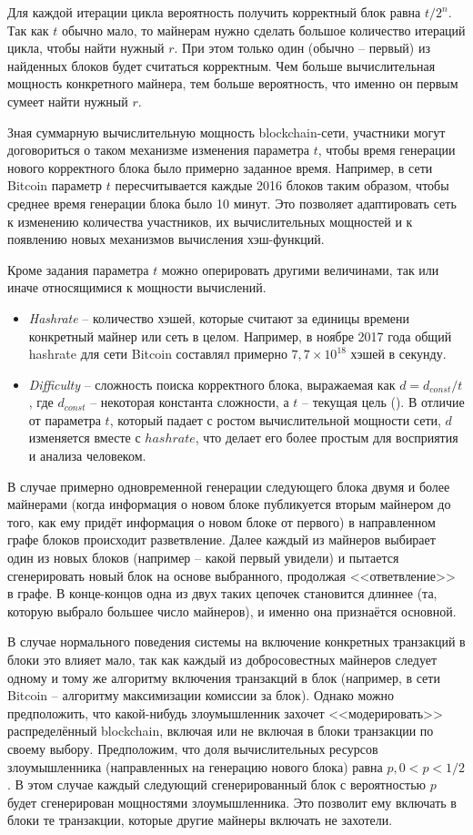 Для каждой итерации цикла вероятность получить корректный блок равна $t / 2^{n}$. Так как $t$ обычно мало, то майнерам нужно сделать большое количество итераций цикла, чтобы найти нужный $r$. При этом только один (обычно -- первый) из найденных блоков будет считаться корректным. Чем больше вычислительная мощность конкретного майнера, тем больше вероятность, что именно он первым сумеет найти нужный $r$.

Зная суммарную вычислительную мощность blockchain-сети, участники могут договориться о таком механизме изменения параметра $t$, чтобы время генерации нового корректного блока было примерно заданное время. Например, в сети Bitcoin параметр $t$ пересчитывается каждые 2016 блоков таким образом, чтобы среднее время генерации блока было 10 минут. Это позволяет адаптировать сеть к изменению количества участников, их вычислительных мощностей и к появлению новых механизмов вычисления хэш-функций.

Кроме задания параметра $t$ можно оперировать другими величинами, так или иначе относящимися к мощности вычислений.
\begin{itemize}
	\item \textit{Hashrate} -- количество хэшей, которые считают за единицы времени конкретный майнер или сеть в целом. Например, в ноябре 2017 года общий hashrate для сети Bitcoin составлял примерно $7,7 \times 10^{18}$ хэшей в секунду.
	\item \textit{Difficulty} -- сложность поиска корректного блока, выражаемая как $d = d_{const} / t$, где $d_{const}$ -- некоторая константа сложности, а $t$ -- текущая цель (). В отличие от параметра $t$, который падает с ростом вычислительной мощности сети, $d$ изменяется вместе с $hashrate$, что делает его более простым для восприятия и анализа человеком.
\end{itemize}

В случае примерно одновременной генерации следующего блока двумя и более майнерами (когда информация о новом блоке публикуется вторым майнером до того, как ему придёт информация о новом блоке от первого) в направленном графе блоков происходит разветвление. Далее каждый из майнеров выбирает один из новых блоков (например -- какой первый увидели) и пытается сгенерировать новый блок на основе выбранного, продолжая <<ответвление>> в графе. В конце-концов одна из двух таких цепочек становится длиннее (та, которую выбрало большее число майнеров), и именно она признаётся основной.

В случае нормального поведения системы на включение конкретных транзакций в блоки это влияет мало, так как каждый из добросовестных майнеров следует одному и тому же алгоритму включения транзакций в блок (например, в сети Bitcoin -- алгоритму максимизации комиссии за блок). Однако можно предположить, что какой-нибудь злоумышленник захочет <<модерировать>> распределённый blockchain, включая или не включая в блоки транзакции по своему выбору. Предположим, что доля вычислительных ресурсов злоумышленника (направленных на генерацию нового блока) равна $p, 0 < p < 1/2$. В этом случае каждый следующий сгенерированный блок с вероятностью $p$ будет сгенерирован мощностями злоумышленника. Это позволит ему включать в блоки те транзакции, которые другие майнеры включать не захотели.

